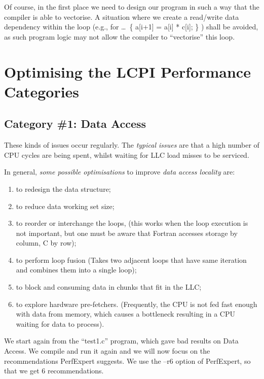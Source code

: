 Of course, in the first place we need to design our program in such a way that the compiler is able to vectorise. A situation where we create a read/write data dependency within the loop (e.g., for \ldots\  \{ a[i+1] = a[i] * c[i]; \} ) shall be avoided, as such program logic may not allow the compiler to ``vectorise'' this loop.

\section{Optimising the LCPI Performance Categories}
\label{sec:Optimizing_the_LCPI_Performance_Categories}

\subsection{Category \#1: Data Access}
\label{ch03:subsec:CAT1_Data_Access}

These kinds of issues occur regularly. The \emph{typical issues} are that a high number of CPU cycles are being spent, whilst waiting for LLC load misses to be serviced.

In general, \emph{some possible optimisations} to improve \emph{data access locality} are:

\begin{enumerate}
  \item  to redesign the data structure;
  \item  to reduce data working set size;
  \item  to reorder or interchange the loops, (this works when the loop execution is not important, but one must be aware that Fortran accesses storage by column, C by row);
  \item  to perform loop fusion (Takes two adjacent loops that have same iteration and combines them into a single loop);
  \item  to block and consuming data in chunks that fit in the LLC;
  \item  to explore hardware pre-fetchers. (Frequently, the CPU is not fed fast enough with data from memory, which causes a bottleneck resulting in a CPU waiting for data to process).
\end{enumerate}

We start again from the ``test1.c'' program, which gave bad results on Data Access. We compile and run it again and we will now focus on the recommendations PerfExpert suggests. We use the --r6 option of PerfExpert, so that we get 6 recommendations.


